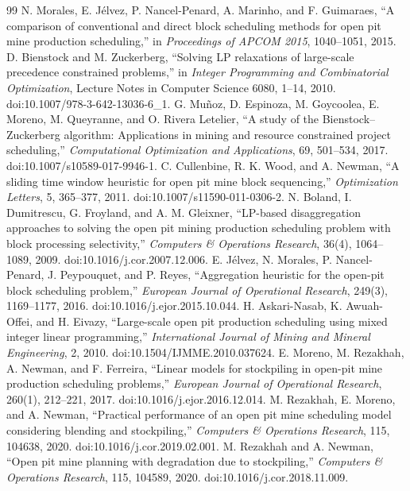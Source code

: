 \documentclass[11pt]{article}
\begin{document}
\begin{thebibliography}{99}
 N. Morales, E. J\'elvez, P. Nancel-Penard, A. Marinho, and F. Guimaraes, ``A comparison of conventional and direct block scheduling methods for open pit mine production scheduling,'' in \emph{Proceedings of APCOM 2015}, 1040--1051, 2015.
 D. Bienstock and M. Zuckerberg, ``Solving LP relaxations of large-scale precedence constrained problems,'' in \emph{Integer Programming and Combinatorial Optimization}, Lecture Notes in Computer Science 6080, 1--14, 2010. doi:10.1007/978-3-642-13036-6\_1.
 G. Mu\~noz, D. Espinoza, M. Goycoolea, E. Moreno, M. Queyranne, and O. Rivera Letelier, ``A study of the Bienstock--Zuckerberg algorithm: Applications in mining and resource constrained project scheduling,'' \emph{Computational Optimization and Applications}, 69, 501--534, 2017. doi:10.1007/s10589-017-9946-1.
 C. Cullenbine, R. K. Wood, and A. Newman, ``A sliding time window heuristic for open pit mine block sequencing,'' \emph{Optimization Letters}, 5, 365--377, 2011. doi:10.1007/s11590-011-0306-2.
 N. Boland, I. Dumitrescu, G. Froyland, and A. M. Gleixner, ``LP-based disaggregation approaches to solving the open pit mining production scheduling problem with block processing selectivity,'' \emph{Computers \& Operations Research}, 36(4), 1064--1089, 2009. doi:10.1016/j.cor.2007.12.006.
 E. J\'elvez, N. Morales, P. Nancel-Penard, J. Peypouquet, and P. Reyes, ``Aggregation heuristic for the open-pit block scheduling problem,'' \emph{European Journal of Operational Research}, 249(3), 1169--1177, 2016. doi:10.1016/j.ejor.2015.10.044.
 H. Askari-Nasab, K. Awuah-Offei, and H. Eivazy, ``Large-scale open pit production scheduling using mixed integer linear programming,'' \emph{International Journal of Mining and Mineral Engineering}, 2, 2010. doi:10.1504/IJMME.2010.037624.
 E. Moreno, M. Rezakhah, A. Newman, and F. Ferreira, ``Linear models for stockpiling in open-pit mine production scheduling problems,'' \emph{European Journal of Operational Research}, 260(1), 212--221, 2017. doi:10.1016/j.ejor.2016.12.014.
 M. Rezakhah, E. Moreno, and A. Newman, ``Practical performance of an open pit mine scheduling model considering blending and stockpiling,'' \emph{Computers \& Operations Research}, 115, 104638, 2020. doi:10.1016/j.cor.2019.02.001.
 M. Rezakhah and A. Newman, ``Open pit mine planning with degradation due to stockpiling,'' \emph{Computers \& Operations Research}, 115, 104589, 2020. doi:10.1016/j.cor.2018.11.009.

\end{thebibliography}
\end{document}
